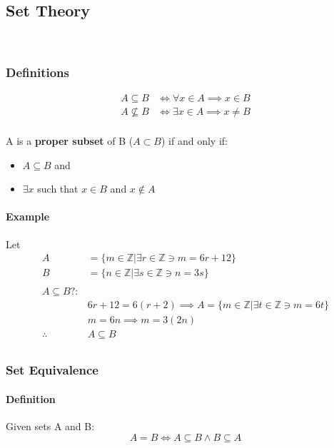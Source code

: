\subsection{Set Theory}
\hrulefill\\

\subsubsection*{Definitions}
\begin{align*}
    A \subseteq B &\iff \forall x \in A \implies x \in B\\
    A \nsubseteq B &\iff \exists x \in A \implies x \neq B\\
\end{align*}

A is a \textbf{proper subset} of B ($A \subset B$) if and only if:
\begin{itemize}
    \item $A \subseteq B$ and
    \item $\exists x$ such that $x \in B$ and $x \notin A$
\end{itemize}

\paragraph*{Example}
Let 
\begin{align*}
    A &= \{m \in \mathbb{Z} | \exists r \in \mathbb{Z} \ni m = 6r + 12\}\\
    B &= \{n \in \mathbb{Z} | \exists s \in \mathbb{Z} \ni n = 3s\}\\
    \\
    A \subseteq B?:\\
    &6r + 12 = 6(r + 2) \implies A = \{m \in \mathbb{Z} | \exists t \in \mathbb{Z} \ni m = 6t\}\\
    &m = 6n \implies m = 3(2n)\\
    \therefore \quad & A \subseteq B\\
\end{align*}

\subsubsection*{Set Equivalence}
\paragraph*{Definition}
Given sets A and B:
\begin{equation}
    A = B \iff A \subseteq B \land B \subseteq A
\end{equation}

